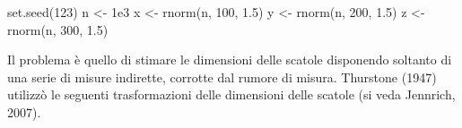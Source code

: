 \documentclass[
  11pt,
]{krantz}
\makeatletter
\newenvironment{Shaded}{\begin{snugshade}}{\end{snugshade}}
\newcommand{\DecValTok}[1]{\textcolor[rgb]{0.06,0.06,0.06}{#1}}
\newcommand{\FloatTok}[1]{\textcolor[rgb]{0.06,0.06,0.06}{#1}}
\newcommand{\FunctionTok}[1]{\textcolor[rgb]{0,0,0}{#1}}
\newcommand{\NormalTok}[1]{#1}
\newcommand{\OtherTok}[1]{\textcolor[rgb]{0.37,0.37,0.37}{#1}}
\newenvironment{kframe}{%
\medskip{}
\setlength{\fboxsep}{.8em}
 \def\at@end@of@kframe{}%
 \ifinner\ifhmode%
  \def\at@end@of@kframe{\end{minipage}}%
  \begin{minipage}{\columnwidth}%
 \fi\fi%
 \def\FrameCommand##1{\hskip\@totalleftmargin \hskip-\fboxsep
 \colorbox{shadecolor}{##1}\hskip-\fboxsep
     \hskip-\linewidth \hskip-\@totalleftmargin \hskip\columnwidth}%
 \MakeFramed {\advance\hsize-\width
   \@totalleftmargin\z@ \linewidth\hsize
   \@setminipage}}%
 {\par\unskip\endMakeFramed%
 \at@end@of@kframe}
\renewenvironment{Shaded}{\begin{kframe}}{\end{kframe}}
\theoremstyle{definition}
\theoremstyle{definition}
\theoremstyle{definition}
\theoremstyle{definition}
\theoremstyle{remark}
\makeatother
\begin{document}
\begin{Shaded}
\begin{Highlighting}[]
\FunctionTok{set.seed}\NormalTok{(}\DecValTok{123}\NormalTok{)}
\NormalTok{n }\OtherTok{\textless{}{-}} \FloatTok{1e3}
\NormalTok{x }\OtherTok{\textless{}{-}} \FunctionTok{rnorm}\NormalTok{(n, }\DecValTok{100}\NormalTok{, }\FloatTok{1.5}\NormalTok{)}
\NormalTok{y }\OtherTok{\textless{}{-}} \FunctionTok{rnorm}\NormalTok{(n, }\DecValTok{200}\NormalTok{, }\FloatTok{1.5}\NormalTok{)}
\NormalTok{z }\OtherTok{\textless{}{-}} \FunctionTok{rnorm}\NormalTok{(n, }\DecValTok{300}\NormalTok{, }\FloatTok{1.5}\NormalTok{)}
\end{Highlighting}
\end{Shaded}

Il problema è quello di stimare le dimensioni delle scatole disponendo soltanto di una serie di misure indirette, corrotte dal rumore di misura. Thurstone (1947) utilizzò le seguenti trasformazioni delle dimensioni delle scatole (si veda Jennrich, 2007).
\end{document}
